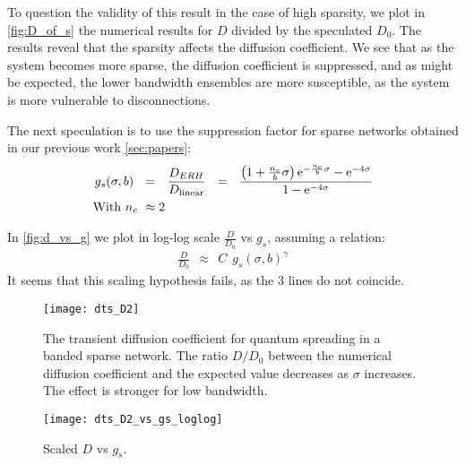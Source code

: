 To question the validity of this result in the case of high sparsity,
we plot in \autoref{fig:D_of_s} the numerical results for $D$ divided by 
the speculated $D_0$. The results reveal that the sparsity affects the diffusion coefficient.
We see that as the system becomes more sparse, the diffusion coefficient is suppressed,
and as might be expected, the lower bandwidth ensembles are more
susceptible, as the system is more vulnerable to disconnections.


The next speculation is to use the suppression factor for sparse networks 
obtained in our previous work \autoref{sec:papers}:
%
\begin{align}
g_s(\sigma, b)\ \ &=\ \ \frac{D_{ERH}}{D_{\textrm{linear}}}\ \ =\ \ 
\frac{  \left(1+\frac{n_c}{b}\sigma\right)\eexp{-\frac{n_c}{b}\sigma}
                                              - \eexp{-4\sigma}}{1-\eexp{-4\sigma}}\\
\textrm{With } n_c\ &\approx 2
\end{align}

In \autoref{fig:d_vs_g} we plot in log-log scale $\frac{D}{D_0}$ vs $g_s$, assuming a relation:
%
\begin{align}
\frac{D}{D_0}\ \ \approx \ \ C\ \ g_s(\sigma,b)^\gamma
\end{align}
It seems that this scaling hypothesis fails, as the 3 lines do not coincide.


\begin{figure}
\texttt{[image: dts\_D2]}
\caption{The transient diffusion coefficient for quantum spreading in
a banded sparse network. The ratio $D/D_0$ between the numerical diffusion 
coefficient and the expected value decreases as $\sigma$ increases. The effect
is stronger for low bandwidth.}\label{fig:D_of_s}
\end{figure}


\begin{figure}
\texttt{[image: dts\_D2\_vs\_gs\_loglog]}
\caption{Scaled $D$ vs $g_s$. }\label{fig:d_vs_g}
\end{figure}
